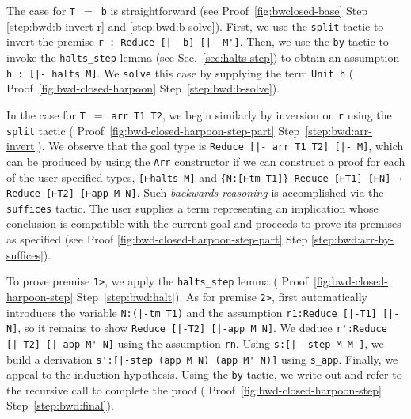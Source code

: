 \begin{HarpoonProof}[htb]
  
\label{fig:bwclosed-base}
\end{HarpoonProof}

The case for \lstinline!T!~$=$~\lstinline!b! is
straightforward (see \Harpoon{} Proof~\ref{fig:bwclosed-base} Step
\ref{step:bwd:b-invert-r} and \ref{step:bwd:b-solve}). First, we use
the \lstinline!split! tactic to invert the premise
\lstinline!r : Reduce [|- b] [|- M']!.
%
Then, we use the \lstinline!by! tactic to invoke the
\lstinline!halts_step! lemma (see Sec.~\ref{sec:halts-step}) to obtain
an assumption \lstinline!h : [|- halts M]!. %
We \lstinline!solve! this case by supplying the term \lstinline!Unit h! %
(\Harpoon{} Proof~\ref{fig:bwd-closed-harpoon} Step~\ref{step:bwd:b-solve}). %

\begin{HarpoonProof}[htb]
  
\end{HarpoonProof}

In the case for \lstinline!T!~$=$~\lstinline!arr T1 T2!, we begin
similarly by inversion on \lstinline!r! using the \lstinline!split!
tactic (\Harpoon{} Proof~\ref{fig:bwd-closed-harpoon-step-part} Step~\ref{step:bwd:arr-invert}).
%
%
%
We observe that the goal type is %
\lstinline!Reduce [|- arr T1 T2] [|- M]!, %
which can be produced by using the \lstinline!Arr! constructor if we can
construct a proof for each of the user-specified types,
\lstinline![⊢halts M]! and
\lstinline!{N:[⊢tm T1]} Reduce [⊢T1] [⊢N] → Reduce [⊢T2] [⊢app M N]!.
%
Such \emph{backwards reasoning} is accomplished via the \lstinline!suffices!
tactic. The user supplies a term representing an implication whose conclusion is
compatible with the current goal and proceeds to
prove its premises as specified
(see \Harpoon{} Proof \ref{fig:bwd-closed-harpoon-step-part} Step \ref{step:bwd:arr-by-suffices}).

To prove premise \lstinline!1>!, we
apply the
\lstinline!halts_step! lemma
(\Harpoon{} Proof~\ref{fig:bwd-closed-harpoon-step} Step~\ref{step:bwd:halt}). %
%
As for premise \lstinline!2>!, \Harpoon{} first automatically introduces the
variable \lstinline!N:(|-tm T1)! and the assumption
\lstinline!r1:Reduce [|-T1] [|-N]!, so it remains to show
\lstinline!Reduce [|-T2] [|-app M N]!.
We deduce \lstinline!r':Reduce [|-T2] [|-app M' N]!
using the assumption
\lstinline!rn!. Using \lstinline!s:[|- step M M']!, we build a
derivation \lstinline!s':[|-step (app M N) (app M' N)]! using
\lstinline!s_app!.
Finally, we appeal to the induction hypothesis. Using the \lstinline!by!
tactic, we write out and refer to the recursive call to complete the proof
(\Harpoon{} Proof~\ref{fig:bwd-closed-harpoon-step} Step~\ref{step:bwd:final}).

